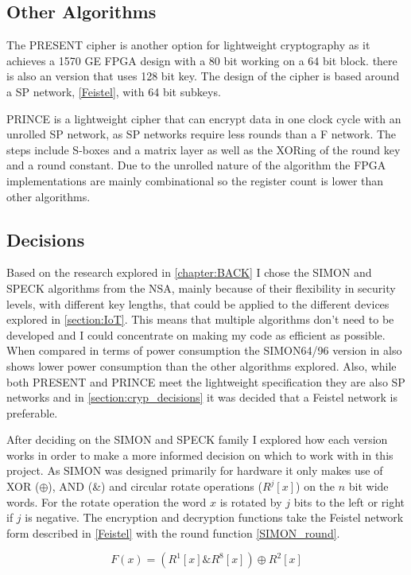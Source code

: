 \documentclass[12pt,twoside,a4paper]{report}
\begin{document}
	\subsection{Other Algorithms}
	The PRESENT cipher is another option for lightweight cryptography as it achieves a 1570 GE FPGA design with a 80 bit working on a 64 bit block. there is also an version that uses 128 bit key. The design of the cipher is based around a SP network, \autoref{Feistel}, with 64 bit subkeys.
    
	PRINCE is a lightweight cipher that can encrypt data in one clock cycle with an unrolled SP network, as SP networks require less rounds than a F network. The steps include S-boxes and a matrix layer as well as the XORing of the round key and a round constant. Due to the unrolled nature of the algorithm the FPGA implementations are mainly combinational so the register count is lower than other algorithms.
    
	\subsection{Decisions}
	Based on the research explored in \autoref{chapter:BACK} I chose the SIMON and SPECK algorithms from the NSA, mainly because of their flexibility in security levels, with different key lengths, that could be applied to the different devices explored in \autoref{section:IoT}. This means that multiple algorithms don't need to be developed and I could concentrate on making my code as efficient as possible. When compared in terms of power consumption the SIMON64/96 version in \cite{Banik2015} also shows lower power consumption than the other algorithms explored. Also, while both PRESENT and PRINCE meet the lightweight specification they are also SP networks and in \autoref{section:cryp_decisions} it was decided that a Feistel network is preferable.
    
	After deciding on the SIMON and SPECK family I explored how each version works in order to make a more informed decision on which to work with in this project. As SIMON was designed primarily for hardware it only makes use of XOR ($\oplus$), AND ($\&$) and circular rotate operations ($R^j[x]$) on the $n$ bit wide words. For the rotate operation the word $x$ is rotated by $j$ bits to the left or right if $j$ is negative. The encryption and decryption functions take the Feistel network form described in \autoref{Feistel} with the round function \autoref{SIMON_round}.
    
	\begin{equation}
	\label{SIMON_round}
	F(x) = (R^1[x]\&R^8[x]) \oplus R^2[x]
	\end{equation}
    
\end{document}
